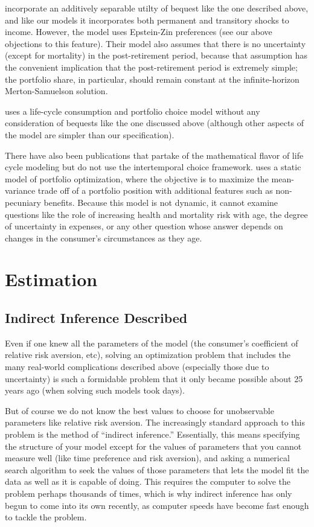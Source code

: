 \documentclass{article}
\begin{document}
\cite{O_Hara_2015} incorporate an additively separable utilty of bequest like the one described above, and like our models it incorporates both permanent and transitory shocks to income.
However, the model uses Epstein-Zin preferences (see our above objections to this feature).
Their model also assumes that there is no uncertainty (except for mortality) in the post-retirement period, because that assumption has the convenient implication that the post-retirement period is extremely simple; the portfolio share, in particular, should remain constant at the infinite-horizon Merton-Samuelson solution.

\cite{Lanski_2022} uses a life-cycle consumption and portfolio choice model without any consideration of bequests like the one discussed above (although other aspects of the model are simpler than our specification).

There have also been publications that partake of the mathematical flavor of life cycle modeling but do not use the intertemporal choice framework.
\cite{Idzorek_2023} uses a static model of portfolio optimization, where the objective is to maximize the mean-variance trade off of a portfolio position with additional features such as non-pecuniary benefits.
Because this model is not dynamic, it cannot examine questions like the role of increasing health and mortality risk with age, the degree of uncertainty in expenses, or any other question whose answer depends on changes in the consumer's circumstances as they age.

\section{Estimation}\label{estimation}

\subsection{Indirect Inference Described}

Even if one knew all the parameters of the model (the consumer's coefficient of relative risk aversion, etc), solving an optimization problem that includes the many real-world complications described above (especially those due to uncertainty) is such a formidable problem that it only became possible about 25 years ago (when solving such models took days).

But of course we do not know the best values to choose for unobservable parameters like relative risk aversion.
The increasingly standard approach to this problem is the method of ``indirect inference.''
Essentially, this means specifying the structure of your model except for the values of parameters that you cannot measure well (like time preference and risk aversion), and asking a numerical search algorithm to seek the values of those parameters that lets the model fit the data as well as it is capable of doing.
This requires the computer to solve the problem perhaps thousands of times, which is why indirect inference has only begun to come into its own recently, as computer speeds have become fast enough to tackle the problem.
\end{document}
